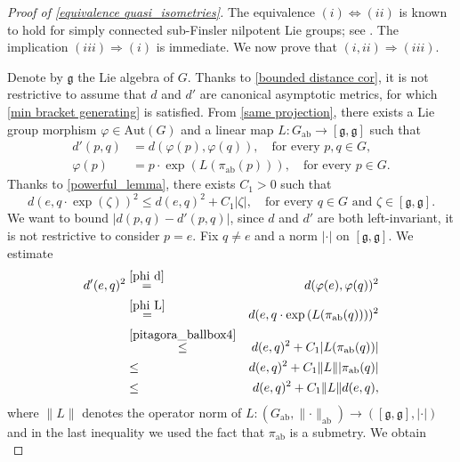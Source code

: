 \documentclass[a4paper,11pt,reqno]{amsart}
\theoremstyle{plain}
\theoremstyle{definition}
\newcommand{\g}{\mathfrak{g}}
\newcommand{\vphi}{\varphi}
\newcommand{\id}{e}
\begin{document}
\begin{proof}[Proof of \cref{equivalence quasi_isometries}]
 The equivalence $(i)\Leftrightarrow(ii)$ is known to hold for simply connected sub-Finsler nilpotent Lie groups; see \cite[Proposition~3]{MR3153949}. The implication $(iii)\Rightarrow(i)$ is immediate. We now prove that $(i, ii)\Rightarrow(iii)$.

 Denote by $\g$ the Lie algebra of $G$. Thanks to \cref{bounded distance cor}, it is not restrictive to assume that $d$ and $d'$ are canonical asymptotic metrics, for which \eqref{min bracket generating} is satisfied. From \cref{same projection}, there exists a Lie group morphism $\vphi \in \mathrm{Aut}(G)$ and a linear map $L \colon G_\mathrm{ab} \to [\g,\g]$ such that
 \begin{align}
 d'(p,q) &= d(\vphi(p),\vphi(q)), \quad \text{for every $p,q \in G$}, \label{phi d}\\
 \vphi(p) &= p \cdot \exp\left(L(\pi_\mathrm{ab}(p))\right), \quad \text{for every $p \in G$.} \label{phi L}
 \end{align}
 Thanks to \cref{powerful_lemma}, there exists $C_1 > 0$ such that 
 \begin{equation} \label{pitagora_ballbox4}
 d(e,q \cdot \exp(\zeta))^2 \le d(e,q)^2 + C_1 \lvert \zeta \rvert, \quad \text{for every $q \in G$ and $\zeta \in [\g,\g]$.}
 \end{equation}
 We want to bound $\lvert d(p,q) - d'(p,q)\rvert$, since $d$ and $d'$ are both left-invariant, it is not restrictive to consider $p=\id$. Fix $q \neq \id$ and a norm $\lvert \cdot \rvert$ on $[\g,\g]$. We estimate
 \begin{eqnarray*}
 d'(\id,q)^2 &\stackrel{\eqref{phi d}}{=}& d(\vphi(\id),\vphi(q))^2 \\
 &\stackrel{\eqref{phi L}}{=}& d(\id,q \cdot \exp\left(L(\pi_\mathrm{ab}(q))\right))^2 \\
 &\stackrel{\eqref{pitagora_ballbox4}}{\le}& d(\id,q)^2 + C_1\lvert L(\pi_\mathrm{ab}(q)) \rvert \\
 &\le& d(\id,q)^2 + C_1\lVert L \rVert \lvert \pi_\mathrm{ab}(q) \rvert \\
 &\le& d(\id,q)^2 + C_1 \lVert L \rVert d(\id,q),
 \end{eqnarray*}
where $\lVert L \rVert$ denotes the operator norm of $L \colon (G_\mathrm{ab},\lVert \cdot \rVert_\mathrm{ab}) \to ([\g,\g],\lvert \cdot \rvert)$ and in the last inequality we used the fact that $\pi_\mathrm{ab}$ is a submetry. We obtain
\begin{equation} 

\end{equation}
\end{proof}
\end{document}

